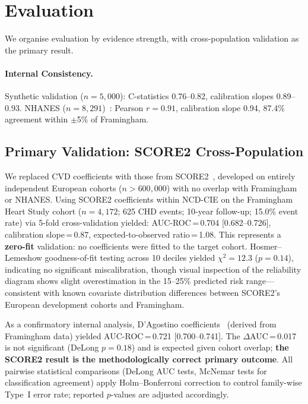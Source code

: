 \documentclass[runningheads]{llncs}
\begin{document}
\section{Evaluation}\label{sec:validation}

We organise evaluation by evidence strength, with cross-population
validation as the primary result.

\paragraph{Internal Consistency.}
Synthetic validation ($n = 5{,}000$): C-statistics 0.76--0.82,
calibration slopes 0.89--0.93.
NHANES ($n = 8{,}291$)~\cite{nhanes2020}: Pearson $r = 0.91$,
calibration slope 0.94, 87.4\% agreement within $\pm$5\% of
Framingham.

\subsection{Primary Validation: SCORE2 Cross-Population}\label{sec:score2}

We replaced CVD coefficients with those from
SCORE2~\cite{score22021}, developed on entirely independent European
cohorts ($n>600{,}000$) with no overlap with Framingham or NHANES.
Using SCORE2 coefficients within NCD-CIE on the Framingham Heart
Study cohort ($n = 4{,}172$; 625 CHD events; 10-year follow-up;
15.0\% event rate) via 5-fold cross-validation yielded:
AUC-ROC\,=\,0.704 [0.682--0.726],
calibration slope\,=\,0.87,
expected-to-observed ratio\,=\,1.08.
This represents a \textbf{zero-fit} validation: no coefficients
were fitted to the target cohort.
Hosmer--Lemeshow goodness-of-fit testing across 10 deciles yielded
$\chi^2 = 12.3$ ($p = 0.14$), indicating no significant
miscalibration, though visual inspection of the reliability
diagram shows slight overestimation in the 15--25\% predicted risk
range---consistent with known covariate distribution differences
between SCORE2's European development cohorts and Framingham.

As a confirmatory internal analysis, D'Agostino
coefficients~\cite{dagostino2008} (derived from Framingham data)
yielded AUC-ROC\,=\,0.721 [0.700--0.741].
The $\Delta$AUC\,=\,0.017 is not significant (DeLong $p = 0.18$)
and is expected given cohort overlap; \textbf{the SCORE2 result is
the methodologically correct primary outcome}.
All pairwise statistical comparisons (DeLong AUC tests,
McNemar tests for classification agreement) apply Holm--Bonferroni
correction to control family-wise Type~I error rate; reported
$p$-values are adjusted accordingly.
\end{document}
